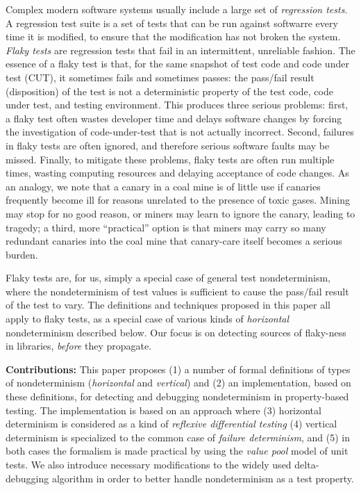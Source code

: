 Complex
modern software systems usually include a large set of
\emph{regression tests}.  A regression test suite is a
set of tests that can be run against softwarre every time it
is modified, to ensure that the modification has not broken the system.  \emph{Flaky tests} \cite{miccoflaky} are regression
tests that fail in an intermittent, unreliable fashion.  The essence of a flaky
test is that, for the same snapshot of test code and code under test
(CUT), it sometimes fails and sometimes passes: the pass/fail result (disposition) of the
test is not a deterministic property of the test code, code under
test, and testing environment.  This produces three serious
problems: first, a flaky test often wastes developer time and delays
software changes by forcing the investigation of code-under-test that
is not actually incorrect.  Second, failures in flaky tests are often ignored, and therefore serious software faults may
be missed.  Finally, to mitigate these problems, flaky tests are often
run multiple times, wasting computing resources and
delaying acceptance of code changes.  As an analogy, we note that  a canary in a coal mine is of
little use if canaries frequently become ill for reasons unrelated to
the presence of toxic gases.  Mining may stop for no good reason, or
miners may learn to ignore the canary, leading to tragedy; a third,
more ``practical'' option is that miners may carry so many redundant
canaries into the coal mine that canary-care itself becomes a serious burden.

Flaky tests are, for us, simply a special case of general test
nondeterminism, where the nondeterminism of test values is sufficient
to cause the pass/fail result of the test to vary.  The definitions
and techniques proposed in this paper all apply to flaky tests, as a
special case of various kinds of \emph{horizontal} nondeterminism
described below.  Our focus is on detecting sources of
flaky-ness in libraries, \emph{before} they propagate.



{\bf Contributions:} This paper proposes (1) a number of formal definitions of types of
nondeterminism (\emph{horizontal} and \emph{vertical}) and (2) an implementation, based on these definitions, for detecting and debugging
nondeterminism in property-based testing.  The implementation is based
on an approach where (3) horizontal determinism is considered as a
kind of \emph{reflexive differential testing} (4) vertical
determinism is specialized to the common case of \emph{failure
  determinism}, and (5)  in both cases the formalism is made practical
by using the \emph{value pool} model of unit tests.
We also introduce necessary modifications to the widely used delta-debugging algorithm in order to better handle
nondeterminism as a test property.

